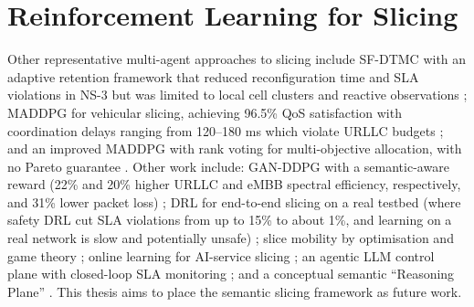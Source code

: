 \section{Reinforcement Learning for Slicing}
Other representative multi-agent approaches to slicing include SF-DTMC with an adaptive retention framework that reduced reconfiguration time and SLA violations in NS-3 but was limited to local cell clusters and reactive observations \cite{li2026}; MADDPG for vehicular slicing, achieving 96.5\% QoS satisfaction with coordination delays ranging from 120--180 ms which violate URLLC budgets \cite{vehicularmarl2023}; and an improved MADDPG with rank voting for multi-objective allocation, with no Pareto guarantee \cite{imaddpg2023}. Other work include: GAN-DDPG with a semantic-aware reward (22\% and 20\% higher URLLC and eMBB spectral efficiency, respectively, and 31\% lower packet loss) \cite{john2026} ; DRL for end-to-end slicing on a real testbed (where safety DRL cut SLA violations from up to 15\% to about 1\%, and learning on a real network is slow and potentially unsafe) \cite{drle2e2023} ; slice mobility by optimisation and game theory \cite{slicemobility2022} ; online learning for AI-service slicing \cite{slicingforai2025} ; an agentic LLM control plane with closed-loop SLA monitoring \cite{agentic2026} ; and a conceptual semantic ``Reasoning Plane'' \cite{chowdhury2025}. This thesis aims to place the semantic slicing framework as future work.


